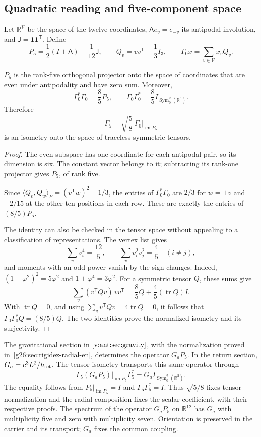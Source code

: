 \subsection{Quadratic reading and five-component space}
Let \(\mathbb R^{\mathcal V}\) be the space of the twelve coordinates,
\(\mathsf A e_v=e_{-v}\) its antipodal involution, and
\(\mathsf J=\mathbf1\mathbf1^{\mathsf T}\). Define
\[
 P_5=\frac12(I+\mathsf A)-\frac1{12}\mathsf J,\qquad
 Q_v=vv^{\mathsf T}-\frac13I_3,\qquad
 \Gamma_0x=\sum_{v\in\mathcal V}x_vQ_v.
\]
\begin{theorem}
\label{vii:thm:portador-pentacomponente}
\(P_5\) is the rank-five orthogonal projector onto the space of
coordinates that are even under antipodality and have zero sum. Moreover,
\[
 \Gamma_0^*\Gamma_0=\frac85P_5,\qquad
 \Gamma_0\Gamma_0^*=\frac85I_{\operatorname{Sym}^2_0(\mathbb R^3)}.
\]
Therefore
\[
 \Gamma_5=\sqrt{\frac58}\,\Gamma_0|_{\operatorname{im}P_5}
\]
is an isometry onto the space of traceless symmetric tensors.
\end{theorem}
\begin{proof}
The even subspace has one coordinate for each antipodal pair, so
its dimension is six. The constant vector belongs to it; subtracting its
rank-one projector gives \(P_5\), of rank five.

Since
\(\langle Q_v,Q_w\rangle_F=(v^{\mathsf T}w)^2-1/3\), the entries
of \(\Gamma_0^*\Gamma_0\) are \(2/3\) for \(w=\pm v\) and
\(-2/15\) at the other ten positions in each row. These are
exactly the entries of \((8/5)P_5\).

The identity can also be checked in the tensor space without
appealing to a classification of representations. The vertex list gives
\[
 \sum_vv_i^4=\frac{12}{5},\qquad
 \sum_vv_i^2v_j^2=\frac45\quad(i\ne j),
\]
and moments with an odd power vanish by the sign changes.
Indeed,
\((1+\varphi^2)^2=5\varphi^2\) and \(1+\varphi^4=3\varphi^2\).
For a symmetric tensor \(Q\), these sums give
\[
 \sum_v(v^{\mathsf T}Qv)\,vv^{\mathsf T}
 =\frac85Q+\frac45(\operatorname{tr}Q)I.
\]
With \(\operatorname{tr}Q=0\), and using
\(\sum_vv^{\mathsf T}Qv=4\operatorname{tr}Q=0\), it follows that
\(\Gamma_0\Gamma_0^*Q=(8/5)Q\). The two identities prove
the normalized isometry and its surjectivity.
\end{proof}

The gravitational section in \(\ref{v:ant:sec:gravity}\), with the
normalization proved in~\ref{g26:sec:rigidez-radial-en}, determines
the operator \(G_aP_5\). In the return section,
\(G_a=c^3L^2/\hbar_{\rm ret}\). The tensor isometry transports
this same operator through
\[
 \Gamma_5(G_aP_5)|_{\operatorname{im}P_5}\Gamma_5^*
   =G_a I_{\operatorname{Sym}^2_0(\mathbb R^3)}.
\]
The equality follows from \(P_5|_{\operatorname{im}P_5}=I\) and
\(\Gamma_5\Gamma_5^*=I\). Thus \(\sqrt{5/8}\) fixes tensor
normalization and the radial composition fixes the scalar coefficient,
with their respective proofs.
The spectrum of the operator \(G_aP_5\) on \(\mathbb R^{12}\)
has \(G_a\) with multiplicity
five and zero with multiplicity seven. Orientation is preserved in
the carrier and its transport; \(G_a\) fixes the common coupling.

